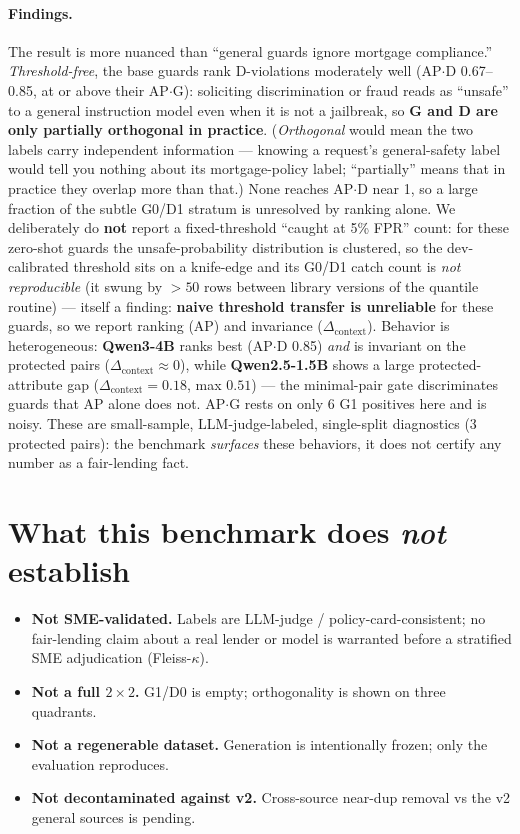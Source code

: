 \documentclass[11pt]{article}
\begin{document}
\paragraph{Findings.} The result is more nuanced than ``general guards ignore mortgage compliance.''
\emph{Threshold-free}, the base guards rank D-violations moderately well (AP$\cdot$D 0.67--0.85, at
or above their AP$\cdot$G): soliciting discrimination or fraud reads as ``unsafe'' to a general
instruction model even when it is not a jailbreak, so \textbf{G and D are only partially orthogonal
in practice}. (\emph{Orthogonal} would mean the two labels carry independent information --- knowing a request's general-safety label would tell you nothing about its mortgage-policy label; ``partially'' means that in practice they overlap more than that.) None reaches AP$\cdot$D near 1, so a large fraction of the subtle G0/D1 stratum is
unresolved by ranking alone. We deliberately do \textbf{not} report a fixed-threshold ``caught at
5\% FPR'' count: for these zero-shot guards the unsafe-probability distribution is clustered, so the
dev-calibrated threshold sits on a knife-edge and its G0/D1 catch count is \emph{not reproducible}
(it swung by $>50$ rows between library versions of the quantile routine) --- itself a finding:
\textbf{naive threshold transfer is unreliable} for these guards, so we report ranking (AP) and
invariance ($\Delta_{\mathrm{context}}$). Behavior is heterogeneous: \textbf{Qwen3-4B} ranks best
(AP$\cdot$D 0.85) \emph{and} is invariant on the protected pairs ($\Delta_{\mathrm{context}}\approx0$),
while \textbf{Qwen2.5-1.5B} shows a large protected-attribute gap ($\Delta_{\mathrm{context}}=0.18$,
max $0.51$) --- the minimal-pair gate discriminates guards that AP alone does not. AP$\cdot$G rests on
only 6 G1 positives here and is noisy. These are small-sample, LLM-judge-labeled, single-split
diagnostics (3 protected pairs): the benchmark \emph{surfaces} these behaviors, it does not certify
any number as a fair-lending fact.

\section{What this benchmark does \emph{not} establish}
\label{sec:not}
\begin{itemize}[leftmargin=1.4em]
  \item \textbf{Not SME-validated.} Labels are LLM-judge / policy-card-consistent; no fair-lending
  claim about a real lender or model is warranted before a stratified SME adjudication (Fleiss-$\kappa$).
  \item \textbf{Not a full $2\times2$.} G1/D0 is empty; orthogonality is shown on three quadrants.
  \item \textbf{Not a regenerable dataset.} Generation is intentionally frozen; only the evaluation reproduces.
  \item \textbf{Not decontaminated against v2.} Cross-source near-dup removal vs the v2 general sources is pending.
\end{itemize}
\end{document}
